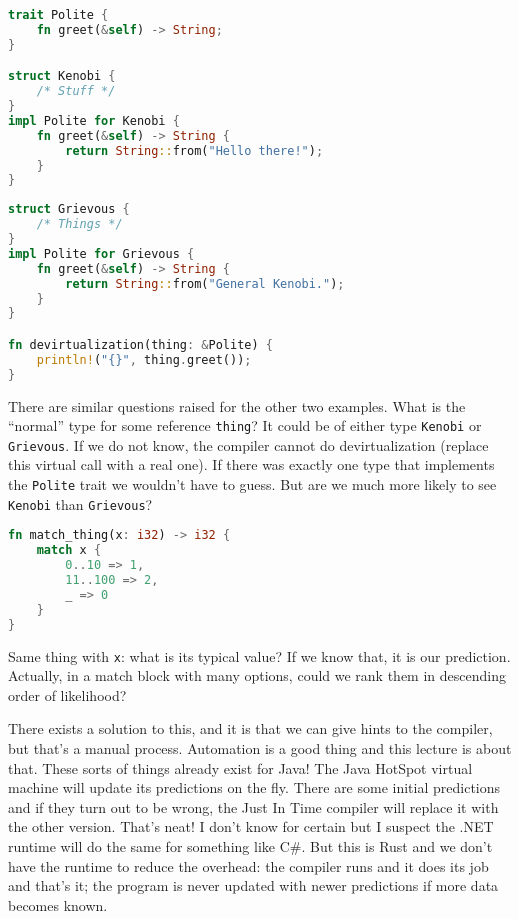 \begin{multicols}{2}
\begin{lstlisting}[language=Rust]
trait Polite {
    fn greet(&self) -> String;
}

struct Kenobi {
    /* Stuff */
}
impl Polite for Kenobi {
    fn greet(&self) -> String {
        return String::from("Hello there!");
    }
}
\end{lstlisting}
\columnbreak
\begin{lstlisting}[language=Rust]
struct Grievous {
    /* Things */
}
impl Polite for Grievous {
    fn greet(&self) -> String {
        return String::from("General Kenobi.");
    }
}

fn devirtualization(thing: &Polite) {
    println!("{}", thing.greet());
}

\end{lstlisting}
\end{multicols}



There are similar questions raised for the other two examples. What is the ``normal'' type for some reference \texttt{thing}? It could be of either type \texttt{Kenobi} or \texttt{Grievous}. If we do not know, the compiler cannot do devirtualization (replace this virtual call with a real one). If there was exactly one type that implements the \texttt{Polite} trait we wouldn't have to guess. But are we much more likely to see \texttt{Kenobi} than \texttt{Grievous}?

\begin{lstlisting}[language=Rust]
fn match_thing(x: i32) -> i32 {
    match x {
        0..10 => 1,
        11..100 => 2,
        _ => 0
    }
}
\end{lstlisting}

 Same thing with \texttt{x}: what is its typical value? If we know that, it is our prediction. Actually, in a match block with many options, could we rank them in descending order of likelihood?

There exists a solution to this, and it is that we can give hints to the compiler, but that's a manual process. Automation is a good thing and this lecture is about that. These sorts of things already exist for Java! The Java HotSpot virtual machine will update its predictions on the fly. There are some initial predictions and if they turn out to be wrong, the Just In Time compiler will replace it with the other version. That's neat! I don't know for certain but I suspect the .NET runtime will do the same for something like C\#. But this is Rust and we don't have the runtime to reduce the overhead: the compiler runs and it does its job and that's it; the program is never updated with newer predictions if more data becomes known.

